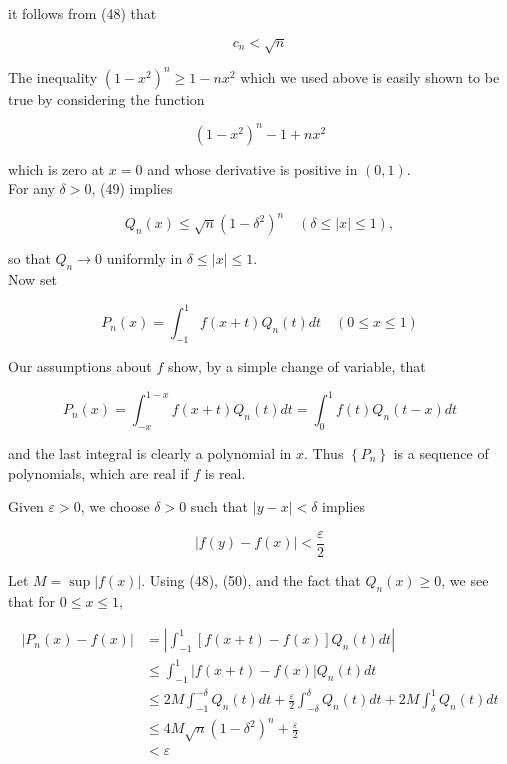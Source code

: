 \documentclass[10pt]{article}
\begin{document}
it follows from (48) that


\begin{equation*}
c_{n}<\sqrt{n} \tag{49}
\end{equation*}


The inequality $\left(1-x^{2}\right)^{n} \geq 1-n x^{2}$ which we used above is easily shown to be true by considering the function

$$
\left(1-x^{2}\right)^{n}-1+n x^{2}
$$

which is zero at $x=0$ and whose derivative is positive in $(0,1)$.\\
For any $\delta>0$, (49) implies


\begin{equation*}
Q_{n}(x) \leq \sqrt{n}\left(1-\delta^{2}\right)^{n} \quad(\delta \leq|x| \leq 1), \tag{50}
\end{equation*}


so that $Q_{n} \rightarrow 0$ uniformly in $\delta \leq|x| \leq 1$.\\
Now set


\begin{equation*}
P_{n}(x)=\int_{-1}^{1} f(x+t) Q_{n}(t) d t \quad(0 \leq x \leq 1) \tag{51}
\end{equation*}


Our assumptions about $f$ show, by a simple change of variable, that

$$
P_{n}(x)=\int_{-x}^{1-x} f(x+t) Q_{n}(t) d t=\int_{0}^{1} f(t) Q_{n}(t-x) d t
$$

and the last integral is clearly a polynomial in $x$. Thus $\left\{P_{n}\right\}$ is a sequence of polynomials, which are real if $f$ is real.

Given $\varepsilon>0$, we choose $\delta>0$ such that $|y-x|<\delta$ implies

$$
|f(y)-f(x)|<\frac{\varepsilon}{2}
$$

Let $M=\sup |f(x)|$. Using (48), (50), and the fact that $Q_{n}(x) \geq 0$, we see that for $0 \leq x \leq 1$,

$$
\begin{aligned}
\left|P_{n}(x)-f(x)\right| & =\left|\int_{-1}^{1}[f(x+t)-f(x)] Q_{n}(t) d t\right| \\
& \leq \int_{-1}^{1}|f(x+t)-f(x)| Q_{n}(t) d t \\
& \leq 2 M \int_{-1}^{-\delta} Q_{n}(t) d t+\frac{\varepsilon}{2} \int_{-\delta}^{\delta} Q_{n}(t) d t+2 M \int_{\delta}^{1} Q_{n}(t) d t \\
& \leq 4 M \sqrt{n}\left(1-\delta^{2}\right)^{n}+\frac{\varepsilon}{2} \\
& <\varepsilon
\end{aligned}
$$
\end{document}
